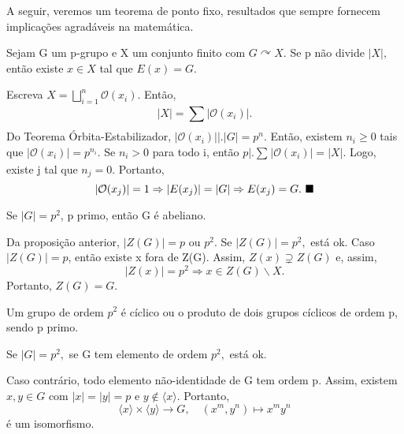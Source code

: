 \documentclass[algebra_notes.tex]{subfiles}
\begin{document}
A seguir, veremos um teorema de ponto fixo, resultados que sempre fornecem implicações
agradáveis na matemática.
\hypertarget{fixed_point}{
	\begin{theorem*}
		Sejam G um p-grupo e X um conjunto finito com \(G \curvearrowright X.\) Se p
		não divide \(|X|,\) então existe \(x\in X\) tal que \(E(x) = G.\)
	\end{theorem*}}
\begin{proof*}
	Escreva \(X = \bigsqcup_{i=1}^{n}{\mathcal{O}(x_{i}).}\) Então,
	\[
		|X| = \sum\limits_{}^{}|\mathcal{O}(x_{i})|.
	\]
	Do Teorema Órbita-Estabilizador, \(|\mathcal{O}(x_{i})|\biggl|\biggr. |G|= p^{n}.\)
	Então, existem \(n_{i}\geq 0\) tais que \(|\mathcal{O}(x_{i})| = p^{n_{i}}.\)
	Se \(n_{i} > 0\) para todo i, então \(p\bigl|\bigr. \sum\limits_{}^{}|\mathcal{O}(x_{i})| = |X|.\)
	Logo, existe j tal que \(n_{j}=0\). Portanto,
	\[
		|\mathcal{O}(x_{j})| = 1 \Rightarrow |E(x_{j})| = |G| \Rightarrow E(x_{j}) = G.\text{ $\blacksquare$}
	\]
\end{proof*}
\begin{prop*}
	Se \(|G| = p^{2}\), p primo, então G é abeliano.
\end{prop*}
\begin{proof*}
	Da proposição anterior, \(|Z(G)| = p\) ou \(p^{2}.\) Se \(|Z(G)|=p^{2},\) está ok.
	Caso \(|Z(G)| = p\), então existe x fora de Z(G). Assim, \(Z(x)\supsetneq{Z(G)}\) e, assim,
	\[
		|Z(x)| = p^{2} \Rightarrow x\in Z(G)\backslash X.
	\]
	Portanto, \(Z(G) = G.\) \qedsymbol
\end{proof*}
\begin{crl*}
	Um grupo de ordem \(p^{2}\) é cíclico ou o produto de dois grupos cíclicos de ordem p, sendo p primo.
\end{crl*}
\begin{proof*}
	Se \(|G| = p^{2},\) se G tem elemento de ordem \(p^{2},\) está ok.

	Caso contrário, todo elemento não-identidade de G tem ordem p. Assim, existem
	\(x, y\in G\) com \(|x|=|y| = p\) e \(y\not\in\langle x\rangle\). Portanto,
	\[
		\langle x\rangle \times\langle y\rangle\rightarrow G, \quad (x^{m}, y^{n})\mapsto x^{m}y^{n}
	\]
	é um isomorfismo. \qedsymbol
\end{proof*}
\newpage
\end{document}
